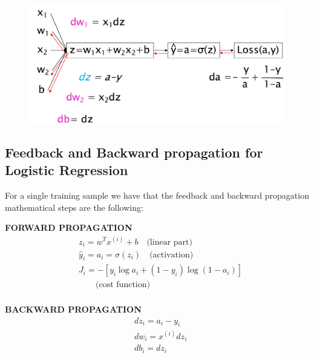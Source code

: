 \begin{figure}[h]
    \centering
    \includegraphics[scale=0.5]{img/compgraph_Loss.png}   
\end{figure}

\subsection{Feedback and Backward propagation for Logistic Regression}
For a single training sample we have that the feedback and backward propagation mathematical steps are the following:
\begin{multicols}{2}
    \noindent
    \textbf{FORWARD PROPAGATION}
    \begin{align*}
        &z_i=w^T{x^{(i)}}+b \quad \text{(linear part)}\\
        &\hat{y}_i=a_i=\sigma(z_{i})   \quad \text{(activation)}\\
        &J_{i}=-[y_{i}\log{a_{i}}+(1-y_{i})\log(1-a_{i})] \\
        & \quad \quad \text{(cost function)}
    \end{align*}
    \newcolumn\\
    \noindent
    \textbf{BACKWARD PROPAGATION}
    \begin{align*}
        &dz_i = a_i-y_i\\
        &dw_i={x^{(i)}}{dz_i}\\
        &db_i=dz_i
    \end{align*}
\end{multicols}
